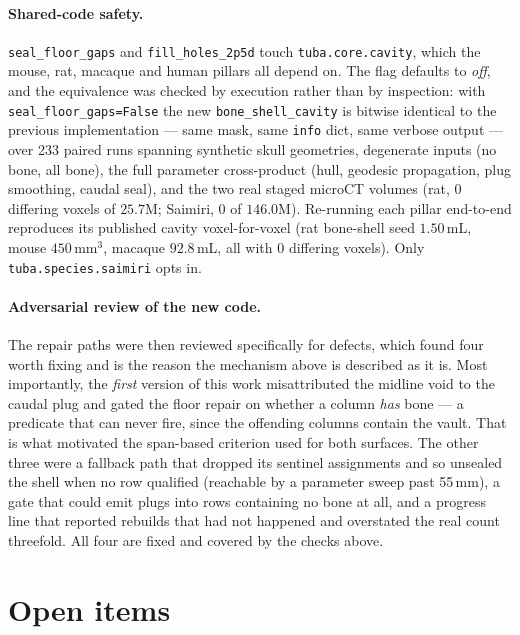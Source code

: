 \documentclass{compactarticle}
\begin{document}
\paragraph{Shared-code safety.}
\texttt{seal\_floor\_gaps} and \texttt{fill\_holes\_2p5d} touch
\texttt{tuba.core.cavity}, which the mouse, rat, macaque and human
pillars all depend on. The flag defaults to \emph{off}, and the
equivalence was checked by execution rather than by inspection: with
\texttt{seal\_floor\_gaps=False} the new
\texttt{bone\_shell\_cavity} is bitwise identical to the previous
implementation --- same mask, same \texttt{info} dict, same verbose
output --- over 233 paired runs spanning synthetic skull geometries,
degenerate inputs (no bone, all bone), the full parameter cross-product
(hull, geodesic propagation, plug smoothing, caudal seal), and the two
real staged microCT volumes (rat, 0 differing voxels of $25.7$M;
Saimiri, 0 of $146.0$M). Re-running each pillar end-to-end reproduces
its published cavity voxel-for-voxel (rat bone-shell seed $1.50$\,mL,
mouse $450$\,mm$^3$, macaque $92.8$\,mL, all with 0 differing voxels).
Only \texttt{tuba.species.saimiri} opts in.

\paragraph{Adversarial review of the new code.}
The repair paths were then reviewed specifically for defects, which
found four worth fixing and is the reason the mechanism above is
described as it is. Most importantly, the \emph{first} version of this
work misattributed the midline void to the caudal plug and gated the
floor repair on whether a column \emph{has} bone --- a predicate that
can never fire, since the offending columns contain the vault. That is
what motivated the span-based criterion used for both surfaces. The
other three were a fallback path that dropped its sentinel assignments
and so unsealed the shell when no row qualified (reachable by a
parameter sweep past 55\,mm), a gate that could emit plugs into rows
containing no bone at all, and a progress line that reported rebuilds
that had not happened and overstated the real count threefold. All four
are fixed and covered by the checks above.

\section{Open items}
\label{sec:open}
\end{document}
